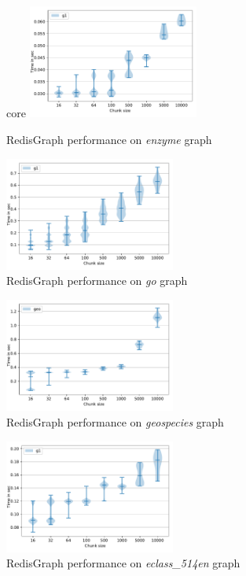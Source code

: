 \begin{figure}[h]core
\centering
\includegraphics[width=0.5\textwidth]{data/raw_redis/enzyme.pdf}
\caption{RedisGraph performance on \textit{enzyme} graph}
\label{fig:redis_enzyme_all}
\end{figure}


\begin{figure}[h]
\centering
\includegraphics[width=0.5\textwidth]{data/raw_redis/go.pdf}
\caption{RedisGraph performance on \textit{go} graph}
\label{fig:redis_go_all}
\end{figure}

\begin{figure}[h]
\centering
\includegraphics[width=0.5\textwidth]{data/raw_redis/geospecies.pdf}
\caption{RedisGraph performance on \textit{geospecies} graph}
\label{fig:redis_geospecies_all}
\end{figure}

\begin{figure}[h]
\centering
\includegraphics[width=0.5\textwidth]{data/raw_redis/eclass_514en.pdf}
\caption{RedisGraph performance on \textit{eclass\_514en} graph}
\label{fig:redis_eclass_all}
\end{figure}

